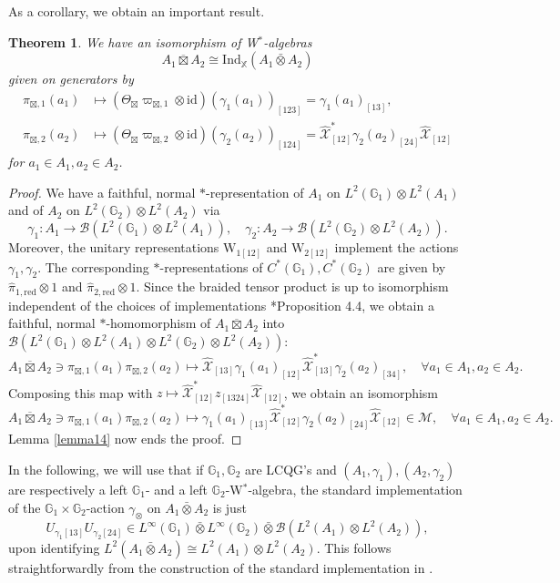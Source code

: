 \documentclass[reqno]{amsart}
\numberwithin{equation}{section}
\newtheorem{Theorem}{Theorem}[section]
\newcommand{\mcB}{\mathcal{B}}
\newcommand{\id}{\mathrm{id}}
\newcommand{\G}{\mathbb{G}}
\newcommand{\X}{\mathbb{X}}
\newcommand{\Ind}{\mathrm{Ind}}
\newcommand{\red}{\mathrm{red}}
\newcommand{\ov}{\overline}
\newcommand{\mc}{\mathcal}
\newcommand{\wh}{\widehat}
\newcommand{\ww}{\mathrm{W}}
\begin{document}
As a corollary, we obtain an important result.

\begin{Theorem}\label{CorIdent}
We have an isomorphism of W$^*$-algebras
\[
A_1\overline{\boxtimes} A_2 \cong \Ind_{\X}(A_1\bar{\otimes} A_2)
\]
given on generators by 
\[\begin{split}
\pi_{\boxtimes,1}(a_1) &\mapsto (\Theta_{\boxtimes}\varpi_{\boxtimes,1}\otimes \id)(\gamma_1(a_1))_{[123]}=\gamma_1(a_1)_{[13]},\\
\pi_{\boxtimes,2}(a_2) &\mapsto (\Theta_{\boxtimes}\varpi_{\boxtimes,2}\otimes \id)(\gamma_2(a_2))_{[124]}=
\wh{\mc{X}}^*_{[12]}\gamma_2(a_2)_{[24]}
\wh{\mc{X}}_{[12]}
\end{split}\]
for $a_1\in A_1,a_2\in A_2$. 
\end{Theorem} 

\begin{proof}
We have a faithful, normal $*$-representation of $A_1$ on $L^2(\G_1)\otimes L^2(A_1)$ and of $A_2$ on $L^2(\G_2) \otimes L^2(A_2)$ via 
\[
\gamma_1\colon A_1\rightarrow \mc{B}(L^2(\G_1)\otimes L^2(A_1)),\quad 
\gamma_2\colon A_2\rightarrow \mc{B}(L^2(\G_2)\otimes L^2(A_2)).
\] 
Moreover, the unitary representations $\ww_{1[12]}$ and $\ww_{2[12]}$ implement the actions $\gamma_1,\gamma_2$. The corresponding $*$-representations of $C^*(\G_1),C^*(\G_2)$ are given by $\hat{\pi}_{1,\red}\otimes 1$ and $\hat{\pi}_{2,\red}\otimes 1$. Since the braided tensor product is up to isomorphism independent of the choices of implementations \cite{DCKr24}*{Proposition 4.4}, we obtain a faithful, normal $*$-homomorphism of $A_1\ov\boxtimes A_2$ into $\mcB(L^2(\G_1)\otimes L^2(A_1)\otimes L^2(\G_2)\otimes L^2(A_2))$: 
\[
A_1\ov\boxtimes A_2\ni \pi_{\boxtimes,1}(a_1)\pi_{\boxtimes,2}(a_2)\mapsto 
\wh{\mc{X}}_{[13]} \gamma_1(a_1)_{[12]}
\wh{\mc{X}}_{[13]}^* \gamma_2(a_2)_{[34]},\quad \forall a_1\in A_1,a_2\in A_2.
\]
Composing this map with $z\mapsto \wh{\mc{X}}^*_{[12]} z_{[1324]}\wh{\mc{X}}_{[12]}$, we obtain an isomorphism
\[
A_1\ov\boxtimes A_2\ni \pi_{\boxtimes,1}(a_1)\pi_{\boxtimes,2}(a_2)\mapsto 
\gamma_1(a_1)_{[13]}
\wh{\mc{X}}_{[12]}^* \gamma_2(a_2)_{[24]}
\wh{\mc{X}}_{[12]}\in \mc{M},  \quad \forall a_1\in A_1,a_2\in A_2.
\]
Lemma \ref{lemma14} now ends the proof.
\end{proof} 


In the following, we will use that if $\G_1,\G_2$ are LCQG's and $(A_1,\gamma_1),(A_2,\gamma_2)$ are respectively a left $\G_1$- and a left $\G_2$-W$^*$-algebra, the standard implementation of the $\G_1\times \G_2$-action $\gamma_\otimes$ on $A_1\bar{\otimes}A_2$ is just 
\[
U_{\gamma_1 [13]}U_{\gamma_2[24]} \in L^{\infty}(\G_1)\bar{\otimes}L^{\infty}(\G_2)\bar{\otimes} \mcB(L^2(A_1)\otimes L^2(A_2)),
\]
upon identifying $L^2(A_1\bar{\otimes}A_2) \cong L^2(A_1)\otimes L^2(A_2)$.
This follows straightforwardly from the construction of the standard implementation in \cite{Vae01}. 
\end{document}
